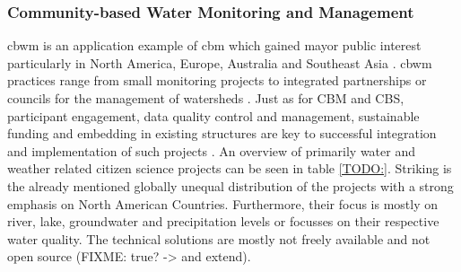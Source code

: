 \subsubsection*{Community-based Water Monitoring and Management}

\acrfull*{cbwm} is an application example of \acrshort*{cbm} which gained mayor public interest particularly in North America, Europe, Australia and Southeast Asia \autocite{kirschkeCitizenScienceProjects2022, koehlerCitizenParticipationCollaborative2008, livinglakescanadaElevatingCommunityBased2018}. \acrshort*{cbwm} practices range from small monitoring projects to integrated partnerships or councils for the management of watersheds \autocite{westonCommunityBasedWaterMonitoring2015}. Just as for CBM and CBS, participant engagement, data quality control and management, sustainable funding and embedding in existing structures are key to successful integration and implementation of such projects \autocite{allenCommunityBasedWaterMonitoring2018,livinglakescanadaCommunityBasedWaterMonitoring2018,westonCommunityBasedWaterMonitoring2015}.
An overview of primarily water and weather related citizen science projects can be seen in table \ref*{TODO:}. Striking is the already mentioned globally unequal distribution of the projects with a strong emphasis on North American Countries. Furthermore, their focus is mostly on river, lake, groundwater and precipitation levels or focusses on their respective water quality. The technical solutions are mostly not freely available and not open source (FIXME: true? -> and extend). 


